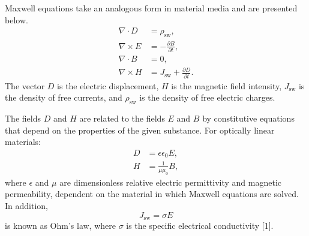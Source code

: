 \documentclass[12pt,a4paper]{article}
\begin{document}
Maxwell equations take an analogous form in material media and are presented below.
\begin{align}
\nabla\cdot D &= \rho_{\mathrm{sw}}, \tag{2.2a}\\
\nabla\times E &= -\frac{\partial B}{\partial t}, \tag{2.2b}\\
\nabla\cdot B &= 0, \tag{2.2c}\\
\nabla\times H &= J_{\mathrm{sw}}+\frac{\partial D}{\partial t}. \tag{2.2d}
\end{align}
The vector $D$ is the electric displacement, $H$ is the magnetic field intensity, $J_{\mathrm{sw}}$ is the
density of free currents, and $\rho_{\mathrm{sw}}$ is the density of free electric charges.

The fields $D$ and $H$ are related to the fields $E$ and $B$ by constitutive equations that depend on
the properties of the given substance. For optically linear materials:
\begin{align}
D &= \epsilon\epsilon_0E, \tag{2.3}\\
H &= \frac{1}{\mu\mu_0}B, \tag{2.4}
\end{align}
where $\epsilon$ and $\mu$ are dimensionless relative electric permittivity and magnetic permeability,
dependent on the material in which Maxwell equations are solved. In addition,
\begin{equation}
J_{\mathrm{sw}}=\sigma E \tag{2.5}
\end{equation}
is known as Ohm's law, where $\sigma$ is the specific electrical conductivity [1].
\end{document}
